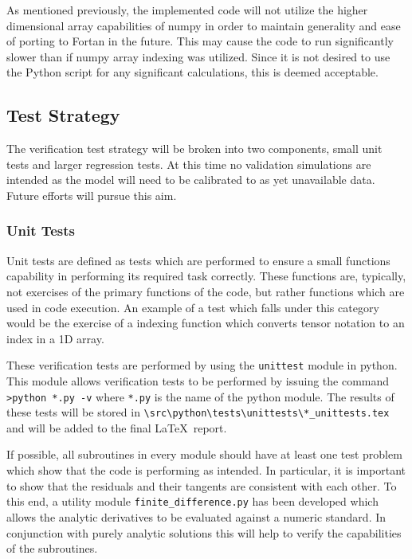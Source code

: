 As mentioned previously, the implemented code will not utilize the higher dimensional array capabilities of numpy in order to maintain generality and ease of porting to Fortan in the future. This may cause the code to run significantly slower than if numpy array indexing was utilized. Since it is not desired to use the Python script for any significant calculations, this is deemed acceptable.



\subsection{Test Strategy}

The verification test strategy will be broken into two components, small unit tests and larger regression tests. At this time no validation simulations are intended as the model will need to be calibrated to as yet unavailable data. Future efforts will pursue this aim.

\subsubsection{Unit Tests}

Unit tests are defined as tests which are performed to ensure a small functions capability in performing its required task correctly. These functions are, typically, not exercises of the primary functions of the code, but rather functions which are used in code execution. An example of a test which falls under this category would be the exercise of a indexing function which converts tensor notation to an index in a 1D array.

These verification tests are performed by using the \verb|unittest| module in python. This module allows verification tests to be performed by issuing the command \verb|>python *.py -v| where \verb|*.py| is the name of the python module. The results of these tests will be stored in \verb|\src\python\tests\unittests\*_unittests.tex| and will be added to the final \LaTeX~report.

If possible, all subroutines in every module should have at least one test problem which show that the code is performing as intended. In particular, it is important to show that the residuals and their tangents are consistent with each other. To this end, a utility module \verb|finite_difference.py| has been developed which allows the analytic derivatives to be evaluated against a numeric standard. In conjunction with purely analytic solutions this will help to verify the capabilities of the subroutines.

